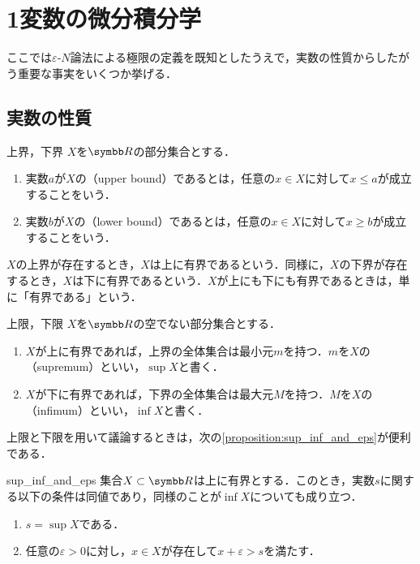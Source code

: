 \documentclass[../../main]{subfiles}
\begin{document}
\section{1変数の微分積分学}

ここでは\(\varepsilon\)‐\(N\)論法による極限の定義を既知としたうえで，実数の性質からしたがう重要な事実をいくつか挙げる．

\subsection{実数の性質}

\begin{definition}{上界，下界}{}
  \(X\)を\(\numset{R}\)の部分集合とする．
  \begin{enumerate}
    \item 実数\(a\)が\(X\)の（upper bound）であるとは，任意の\(x\in X\)に対して\(x\leq a\)が成立することをいう．
    \item 実数\(b\)が\(X\)の（lower bound）であるとは，任意の\(x\in X\)に対して\(x\geq b\)が成立することをいう．
  \end{enumerate}
\end{definition}

\(X\)の上界が存在するとき，\(X\)は上に有界であるという．同様に，\(X\)の下界が存在するとき，\(X\)は下に有界であるという．\(X\)が上にも下にも有界であるときは，単に「有界である」という．

\begin{definition}{上限，下限}{}
  \(X\)を\(\numset{R}\)の空でない部分集合とする．
  \begin{enumerate}
    \item \(X\)が上に有界であれば，上界の全体集合は最小元\(m\)を持つ．\(m\)を\(X\)の（supremum）といい，\(\sup X\)と書く．
    \item \(X\)が下に有界であれば，下界の全体集合は最大元\(M\)を持つ．\(M\)を\(X\)の（infimum）といい，\(\inf X\)と書く．
  \end{enumerate}
\end{definition}

上限と下限を用いて議論するときは，次の\cref{proposition:sup_inf_and_eps}が便利である．

\begin{proposition}{}{sup_inf_and_eps}
  集合\(X\subset\numset{R}\)は上に有界とする．このとき，実数\(s\)に関する以下の条件は同値であり，同様のことが\(\inf X\)についても成り立つ．
  \begin{enumerate}
    \item \(s=\sup X\)である．
    \item 任意の\(\varepsilon>0\)に対し，\(x\in X\)が存在して\(x+\varepsilon>s\)を満たす．
  \end{enumerate}
\end{proposition}
\end{document}

